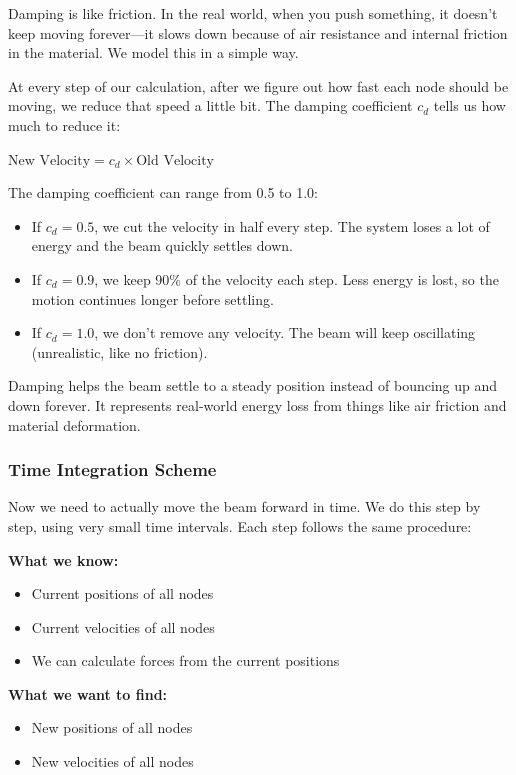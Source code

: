 \documentclass[11pt]{article}
\begin{document}
Damping is like friction. In the real world, when you push something, it doesn't keep moving forever—it slows down because of air resistance and internal friction in the material. We model this in a simple way.

At every step of our calculation, after we figure out how fast each node should be moving, we reduce that speed a little bit. The damping coefficient \(c_d\) tells us how much to reduce it:

\(\text{New Velocity} = c_d \times \text{Old Velocity}\)

The damping coefficient can range from 0.5 to 1.0:
\begin{itemize}
\item If \(c_d = 0.5\), we cut the velocity in half every step. The system loses a lot of energy and the beam quickly settles down.
\item If \(c_d = 0.9\), we keep 90\% of the velocity each step. Less energy is lost, so the motion continues longer before settling.
\item If \(c_d = 1.0\), we don't remove any velocity. The beam will keep oscillating (unrealistic, like no friction).
\end{itemize}

Damping helps the beam settle to a steady position instead of bouncing up and down forever. It represents real-world energy loss from things like air friction and material deformation.
\subsubsection{Time Integration Scheme}
\label{sec:org5bf15a5}

Now we need to actually move the beam forward in time. We do this step by step, using very small time intervals. Each step follows the same procedure:

\textbf{What we know:}
\begin{itemize}
\item Current positions of all nodes
\item Current velocities of all nodes
\item We can calculate forces from the current positions
\end{itemize}

\textbf{What we want to find:}
\begin{itemize}
\item New positions of all nodes
\item New velocities of all nodes
\end{itemize}
\end{document}
